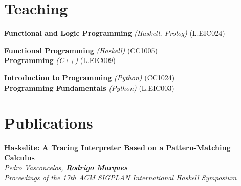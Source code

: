 \documentclass[11pt,a4paper]{moderncv}
\begin{document}

\section{Teaching}

\begin{description}[labelwidth=60pt,align=right,leftmargin=!]
    \item[\normalfont{\emph{Fall 2024}}] \textbf{Functional and Logic Programming} \emph{(Haskell, Prolog)} (L.EIC024)
    \item[\normalfont{\emph{Spring 2024}}] \textbf{Functional Programming} \emph{(Haskell)} (CC1005)\\
                                         \textbf{Programming} \emph{(C++)} (L.EIC009)                                         
    \item[\normalfont{\emph{Fall 2023}}] \textbf{Introduction to Programming} \emph{(Python)} (CC1024)\\
                                         \textbf{Programming Fundamentals} \emph{(Python)} (L.EIC003)
\end{description}


\section{Publications}
\begin{description}[labelwidth=60pt,align=right,leftmargin=!]
    \item[\normalfont{\emph{Haskell 2024}}] 
        \textbf{Haskelite: A Tracing Interpreter Based on a Pattern-Matching Calculus}
        \\ \emph{Pedro Vasconcelos, \textbf{Rodrigo Marques}}
        \\ \emph{Proceedings of the 17th ACM SIGPLAN International Haskell Symposium}    

\end{description}
\end{document}
